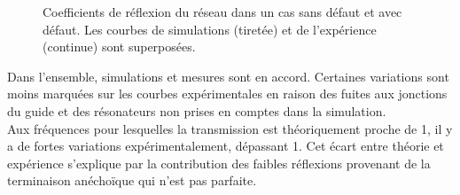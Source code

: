 \begin{figure}[!h]
	\centering
\caption{\label{ref_reflexion1} Coefficients de réflexion du réseau dans un cas sans défaut et avec défaut. Les courbes de simulations (tiretée) et de l’expérience (continue) sont superposées.}
\end{figure}

Dans l'ensemble, simulations et mesures sont en accord. Certaines variations sont moins marquées sur les courbes expérimentales en raison des fuites aux jonctions du guide et des résonateurs non prises en comptes dans la simulation.\\
Aux fréquences pour lesquelles la transmission est théoriquement proche de 1, il y a de fortes variations expérimentalement, dépassant 1. Cet écart entre théorie et expérience s'explique par la contribution des faibles réflexions provenant de la terminaison anéchoïque qui n'est pas parfaite.\\~\\


